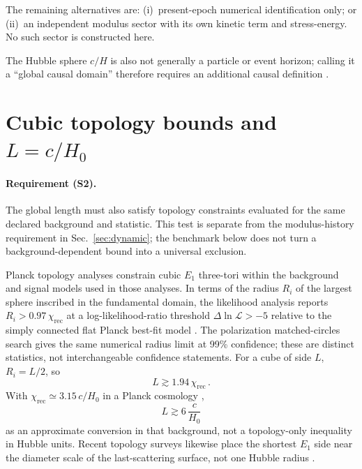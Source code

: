 \documentclass[aps,prd,reprint,superscriptaddress,nofootinbib,floatfix,showkeys]{revtex4-2}
\newcommand{\Hzero}{H_{0}}
\begin{document}
The remaining alternatives are: (i)~present-epoch numerical identification
only; or (ii)~an independent modulus sector with its own kinetic term and
stress-energy.  No such sector is constructed here.

The Hubble sphere \(c/H\) is also not generally a particle or event horizon;
calling it a ``global causal domain'' therefore requires an additional causal
definition \cite{davis_lineweaver_horizon}.

\section{Cubic topology bounds and \texorpdfstring{\(L=c/\Hzero\)}{L = c/H0}}
\label{sec:bounds}

\paragraph{Requirement (S2).}
The global length must also satisfy topology constraints evaluated for the
same declared background and statistic.  This test is separate from the
modulus-history requirement in Sec.~\ref{sec:dynamic}; the benchmark below
does not turn a background-dependent bound into a universal exclusion.

Planck topology analyses constrain cubic \(E_1\) three-tori within the
background and signal models used in those analyses. In terms of the radius
\(R_i\) of the largest sphere inscribed in the fundamental domain, the
likelihood analysis reports \(R_i>0.97\,\chi_{\mathrm{rec}}\) at a
log-likelihood-ratio threshold \(\Delta\ln\mathcal L>-5\) relative to the
simply connected flat Planck best-fit model \cite{planck_topology}.
The polarization matched-circles search gives the same numerical radius
limit at 99\% confidence; these are distinct statistics, not interchangeable
confidence statements. For a cube of side \(L\),
\(R_i=L/2\), so
\begin{equation}
  L \gtrsim 1.94\,\chi_{\mathrm{rec}}\,.
  \label{eq:L-chi}
\end{equation}
With \(\chi_{\mathrm{rec}}\simeq 3.15\,c/\Hzero\) in a Planck cosmology
\cite{planck},
\begin{equation}
  L \gtrsim 6\,\frac{c}{\Hzero}
  \label{eq:L-H}
\end{equation}
as an approximate conversion in that background, not a topology-only
inequality in Hubble units. Recent topology surveys likewise place the shortest
\(E_1\) side near the diameter scale of the last-scattering surface, not one
Hubble radius \cite{compact_promise,planck_topology}.
\end{document}
